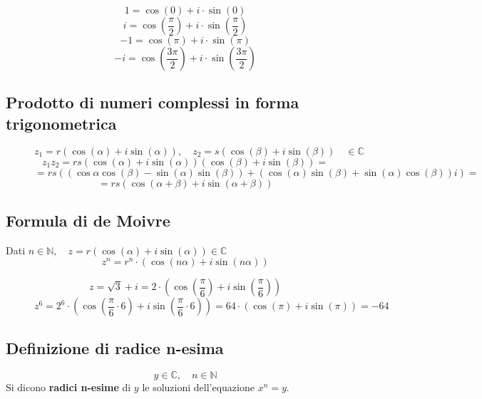 \documentclass[a4paper]{article}
\theoremstyle{break}
\theoremstyle{break}
\theoremstyle{break}
\theoremstyle{break}
\begin{document}
\begin{figure}[H]
	\begin{example}
		\[
			1 = \cos(0) + i \cdot \sin(0)
		\]
		\[
			i = \cos(\frac{\pi}{2}) + i \cdot \sin(\frac{\pi}{2})
		\]
		\[
			-1 = \cos(\pi) + i \cdot \sin(\pi)
		\]
		\[
			-i = \cos(\frac{3\pi}{2}) + i \cdot \sin(\frac{3\pi}{2})
		\]

	\end{example}
\end{figure}

\subsection{Prodotto di numeri complessi in forma trigonometrica}
\begin{figure}[H]
	\begin{definition}
		\[
			z_1 = r\left(\cos(\alpha) + i \sin(\alpha)\right), \quad z_2 = s\left(\cos(\beta) + i \sin(\beta)\right) \quad \in \mathbb{C}
		\]
		\vspace{0.1cm}
		\[
			z_1  z_2 = r  s  (\cos(\alpha) + i \sin(\alpha))  (\cos(\beta) + i \sin(\beta)) =
		\]
		\[
			= r  s  \left( (\cos{\alpha} \cos(\beta) - \sin(\alpha) \sin(\beta)) + (\cos(\alpha) \sin(\beta) + \sin(\alpha) \cos(\beta))i \right) =
		\]
		\[
			= r  s  \left( \cos(\alpha + \beta) + i \sin(\alpha + \beta) \right)
		\]
	\end{definition}
\end{figure}
\subsection{Formula di de Moivre}
Dati \( n \in \mathbb{N}, \quad z = r(\cos(\alpha) + i \sin(\alpha)) \in \mathbb{C} \)
\[
	z^n = r^n \cdot (\cos(n\alpha) + i \sin(n\alpha))
\]

\begin{figure}[H]
	\begin{example}
		\[
			z = \sqrt{3} + i = 2 \cdot \left( \cos(\frac{\pi}{6}) + i \sin(\frac{\pi}{6}) \right)
		\]
		\[
			z^6 = 2^6 \cdot \left( \cos(\frac{\pi}{6} \cdot 6) + i \sin(\frac{\pi}{6} \cdot 6) \right) = 64 \cdot \left( \cos(\pi) + i \sin(\pi) \right) = -64
		\]
	\end{example}
\end{figure}

\subsection{Definizione di radice n-esima}
\[
	y \in  \mathbb{C}, \quad n \in \mathbb{N}
\]
Si dicono \textbf{radici n-esime} di \( y \) le soluzioni dell'equazione \( x^n = y \).
\end{document}
